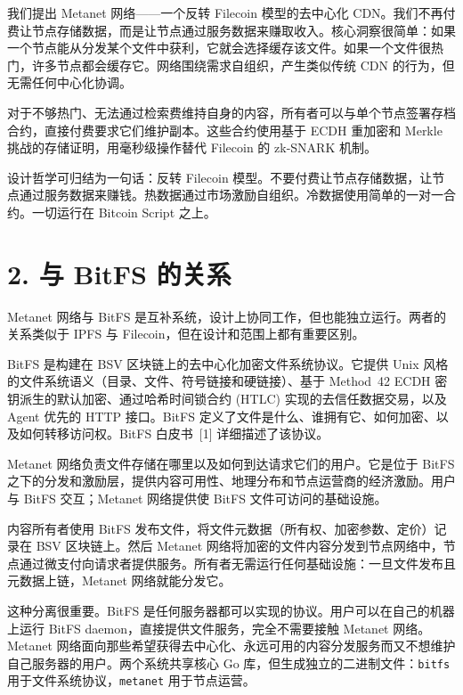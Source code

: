 \documentclass[11pt,a4paper]{article}
\begin{document}
我们提出 Metanet 网络——一个反转 Filecoin 模型的去中心化 CDN。我们不再付费让节点存储数据，而是让节点通过服务数据来赚取收入。核心洞察很简单：如果一个节点能从分发某个文件中获利，它就会选择缓存该文件。如果一个文件很热门，许多节点都会缓存它。网络围绕需求自组织，产生类似传统 CDN 的行为，但无需任何中心化协调。

对于不够热门、无法通过检索费维持自身的内容，所有者可以与单个节点签署存档合约，直接付费要求它们维护副本。这些合约使用基于 ECDH 重加密和 Merkle 挑战的存储证明，用毫秒级操作替代 Filecoin 的 zk-SNARK 机制。

设计哲学可归结为一句话：反转 Filecoin 模型。不要付费让节点存储数据，让节点通过服务数据来赚钱。热数据通过市场激励自组织。冷数据使用简单的一对一合约。一切运行在 Bitcoin Script 之上。

\section{2. 与 BitFS 的关系}

Metanet 网络与 BitFS 是互补系统，设计上协同工作，但也能独立运行。两者的关系类似于 IPFS 与 Filecoin，但在设计和范围上都有重要区别。

BitFS 是构建在 BSV 区块链上的去中心化加密文件系统协议。它提供 Unix 风格的文件系统语义（目录、文件、符号链接和硬链接）、基于 Method~42 ECDH 密钥派生的默认加密、通过哈希时间锁合约 (HTLC) 实现的去信任数据交易，以及 Agent 优先的 HTTP 接口。BitFS 定义了文件是什么、谁拥有它、如何加密、以及如何转移访问权。BitFS 白皮书~[1] 详细描述了该协议。

Metanet 网络负责文件存储在哪里以及如何到达请求它们的用户。它是位于 BitFS 之下的分发和激励层，提供内容可用性、地理分布和节点运营商的经济激励。用户与 BitFS 交互；Metanet 网络提供使 BitFS 文件可访问的基础设施。

内容所有者使用 BitFS 发布文件，将文件元数据（所有权、加密参数、定价）记录在 BSV 区块链上。然后 Metanet 网络将加密的文件内容分发到节点网络中，节点通过微支付向请求者提供服务。所有者无需运行任何基础设施：一旦文件发布且元数据上链，Metanet 网络就能分发它。

这种分离很重要。BitFS 是任何服务器都可以实现的协议。用户可以在自己的机器上运行 BitFS daemon，直接提供文件服务，完全不需要接触 Metanet 网络。Metanet 网络面向那些希望获得去中心化、永远可用的内容分发服务而又不想维护自己服务器的用户。两个系统共享核心 Go 库，但生成独立的二进制文件：\texttt{bitfs} 用于文件系统协议，\texttt{metanet} 用于节点运营。

\end{document}
